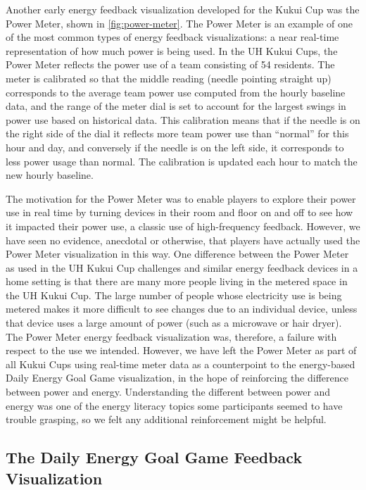 \documentclass[10pt, conference, compsocconf]{IEEEtran-old}
\begin{document}
Another early energy feedback visualization developed for the Kukui Cup was the Power Meter, shown in \autoref{fig:power-meter}. The Power Meter is an example of one of the most common types of energy feedback visualizations: a near real-time representation of how much power is being used. In the UH Kukui Cups, the Power Meter reflects the power use of a team consisting of 54 residents. The meter is calibrated so that the middle reading (needle pointing straight up) corresponds to the average team power use computed from the hourly baseline data, and the range of the meter dial is set to account for the largest swings in power use based on historical data. This calibration means that if the needle is on the right side of the dial it reflects more team power use than ``normal'' for this hour and day, and conversely if the needle is on the left side, it corresponds to less power usage than normal. The calibration is updated each hour to match the new hourly baseline.

The motivation for the Power Meter was to enable players to explore their power use in real time by turning devices in their room and floor on and off to see how it impacted their power use, a classic use of high-frequency feedback. However, we have seen no evidence, anecdotal or otherwise, that players have actually used the Power Meter visualization in this way. One difference between the Power Meter as used in the UH Kukui Cup challenges and similar energy feedback devices in a home setting is that there are many more people living in the metered space in the UH Kukui Cup. The large number of people whose electricity use is being metered makes it more difficult to see changes due to an individual device, unless that device uses a large amount of power (such as a microwave or hair dryer). The Power Meter energy feedback visualization was, therefore, a failure with respect to the use we intended. However, we have left the Power Meter as part of all Kukui Cups using real-time meter data as a counterpoint to the energy-based Daily Energy Goal Game visualization, in the hope of reinforcing the difference between power and energy. Understanding the different between power and energy was one of the energy literacy topics some participants seemed to have trouble grasping, so we felt any additional reinforcement might be helpful.

\subsection{The Daily Energy Goal Game Feedback Visualization}
\end{document}
